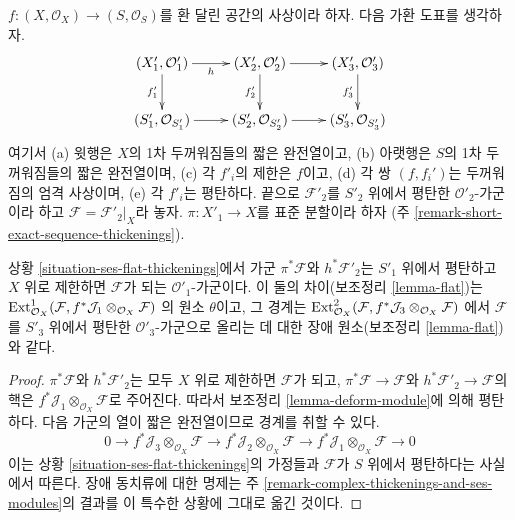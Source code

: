 \begin{situation}
\label{situation-ses-flat-thickenings}
$f : (X, \mathcal{O}_X) \to (S, \mathcal{O}_S)$를 환 달린 공간의
사상이라 하자. 다음 가환 도표를 생각하자.
$$
\xymatrix{
(X'_1, \mathcal{O}'_1) \ar[r]_h \ar[d]_{f'_1} &
(X'_2, \mathcal{O}'_2) \ar[r] \ar[d]_{f'_2} &
(X'_3, \mathcal{O}'_3) \ar[d]_{f'_3} \\
(S'_1, \mathcal{O}_{S'_1}) \ar[r] &
(S'_2, \mathcal{O}_{S'_2}) \ar[r] &
(S'_3, \mathcal{O}_{S'_3})
}
$$
여기서 (a) 윗행은 $X$의 1차 두꺼워짐들의 짧은 완전열이고,
(b) 아랫행은 $S$의 1차 두꺼워짐들의 짧은 완전열이며, (c) 각
$f'_i$의 제한은 $f$이고, (d) 각 쌍 $(f, f_i')$는 두꺼워짐의 엄격
사상이며, (e) 각 $f'_i$는 평탄하다. 끝으로 $\mathcal{F}'_2$를
$S'_2$ 위에서 평탄한 $\mathcal{O}'_2$-가군이라 하고
$\mathcal{F} = \mathcal{F}'_2|_X$라 놓자.
$\pi : X'_1 \to X$를 표준 분할이라 하자
(주 \ref{remark-short-exact-sequence-thickenings}).
\end{situation}

\begin{lemma}
\label{lemma-verify-iv}
상황 \ref{situation-ses-flat-thickenings}에서 가군
$\pi^*\mathcal{F}$와 $h^*\mathcal{F}'_2$는 $S'_1$ 위에서 평탄하고
$X$ 위로 제한하면 $\mathcal{F}$가 되는 $\mathcal{O}'_1$-가군이다.
이 둘의 차이(보조정리 \ref{lemma-flat})는
$\mathop{\mathrm{Ext}}\nolimits^1_{\mathcal{O}_X}(
\mathcal{F}, f^*\mathcal{J}_1 \otimes_{\mathcal{O}_X} \mathcal{F})$
의 원소 $\theta$이고, 그 경계는
$\mathop{\mathrm{Ext}}\nolimits^2_{\mathcal{O}_X}(
\mathcal{F}, f^*\mathcal{J}_3 \otimes_{\mathcal{O}_X} \mathcal{F})$
에서 $\mathcal{F}$를 $S'_3$ 위에서 평탄한 $\mathcal{O}'_3$-가군으로
올리는 데 대한 장애 원소(보조정리 \ref{lemma-flat})와 같다.
\end{lemma}

\begin{proof}
$\pi^*\mathcal{F}$와 $h^*\mathcal{F}'_2$는 모두 $X$ 위로 제한하면
$\mathcal{F}$가 되고, $\pi^*\mathcal{F} \to \mathcal{F}$와
$h^*\mathcal{F}'_2 \to \mathcal{F}$의 핵은
$f^*\mathcal{J}_1 \otimes_{\mathcal{O}_X} \mathcal{F}$로 주어진다.
따라서 보조정리 \ref{lemma-deform-module}에 의해 평탄하다.
다음 가군의 열이 짧은 완전열이므로 경계를 취할 수 있다.
$$
0 \to f^*\mathcal{J}_3 \otimes_{\mathcal{O}_X} \mathcal{F} \to
f^*\mathcal{J}_2 \otimes_{\mathcal{O}_X} \mathcal{F} \to
f^*\mathcal{J}_1 \otimes_{\mathcal{O}_X} \mathcal{F} \to 0
$$
이는 상황 \ref{situation-ses-flat-thickenings}의 가정들과
$\mathcal{F}$가 $S$ 위에서 평탄하다는 사실에서 따른다. 장애 동치류에
대한 명제는 주 \ref{remark-complex-thickenings-and-ses-modules}의
결과를 이 특수한 상황에 그대로 옮긴 것이다.
\end{proof}






